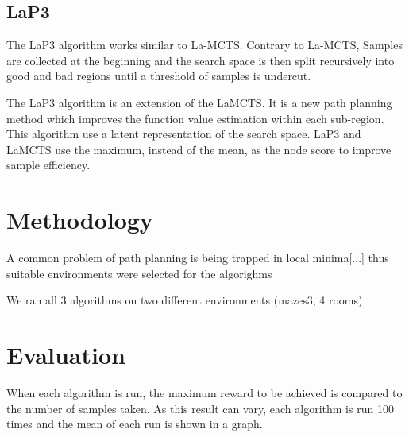 \documentclass[bibliography=totoc]{scrartcl}
\begin{document}
\subsection{LaP3}
The LaP3 algorithm works similar to La-MCTS. Contrary to La-MCTS, Samples are collected at the beginning and the search space is then split recursively into good and bad regions until a threshold of samples is undercut.

The \ac{LaP3} algorithm is an extension of the LaMCTS. \cite{NEURIPS2021_03a3655f}
It is a new path planning method which improves the function value estimation within each sub-region.
This algorithm use a latent representation of the search space.
\ac{LaP3} and \ac{LaMCTS} use the maximum, instead of the mean, as the node score to improve sample efficiency.

\newpage
\section{Methodology}
A common problem of path planning is being trapped in local minima[...] thus suitable environments were selected for the algorighms

We ran all 3 algorithms on two different environments (mazes3, 4 rooms)
\newpage
\section{Evaluation}




When each algorithm is run, the maximum reward to be achieved is compared to the number of samples taken. As this result can vary, each algorithm is run 100 times and the mean of each run is shown in a graph.
\end{document}
